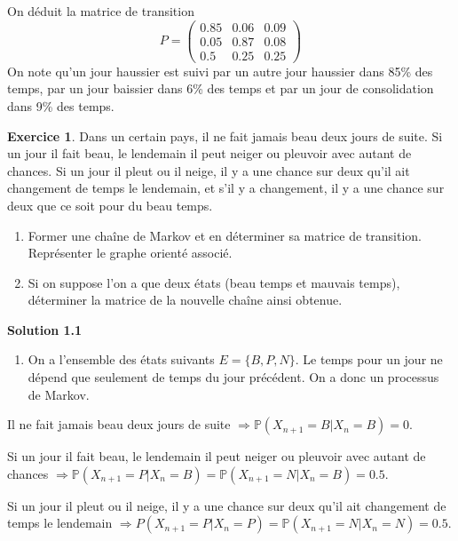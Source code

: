 \documentclass[
]{book}
\providecommand{\tightlist}{%
  \setlength{\itemsep}{0pt}\setlength{\parskip}{0pt}}
\theoremstyle{definition}
\theoremstyle{definition}
\theoremstyle{definition}
\newtheorem{exercise}{Exercice}[chapter]
\theoremstyle{remark}
\begin{document}
On déduit la matrice de transition
\[
P=\left( 
\begin{array}{ccc}
0.85 & 0.06 & 0.09 \\
0.05 & 0.87 & 0.08 \\
0.5 & 0.25 & 0.25
\end{array}
\right)
\]
On note qu'un jour haussier est suivi par un autre jour haussier dans 85\% des temps, par un jour baissier dans 6\% des temps et par un jour de consolidation dans 9\% des temps.
\begin{exercise}
\protect\hypertarget{exr:unnamed-chunk-47}{}{\label{exr:unnamed-chunk-47} }Dans un certain pays, il ne fait jamais beau deux jours de suite. Si un jour il fait beau, le lendemain il peut neiger ou pleuvoir avec autant de chances. Si un jour il pleut ou il neige, il y a une chance sur deux qu'il ait changement de temps le lendemain, et s'il y a changement, il y a une chance sur deux que ce soit pour du beau temps.

\begin{enumerate}
\def\labelenumi{\arabic{enumi}.}
\tightlist
\item
  Former une chaîne de Markov et en déterminer sa matrice de transition. Représenter le graphe orienté associé.
\item
  Si on suppose l'on a que deux états (beau temps et mauvais temps), déterminer la matrice de la nouvelle chaîne ainsi obtenue.
\end{enumerate}
\end{exercise}

\textbf{Solution 1.1}

\begin{enumerate}
\def\labelenumi{\arabic{enumi}.}
\tightlist
\item
  On a l'ensemble des états suivants \(E=\{B,P,N \}\). Le temps pour un jour ne dépend que seulement de temps du jour précédent. On a donc un processus de Markov.
\end{enumerate}

Il ne fait jamais beau deux jours de suite \(\Longrightarrow \mathbb{P}(X_{n+1}=B|X_n=B)=0\).

Si un jour il fait beau, le lendemain il peut neiger ou pleuvoir avec autant de chances \(\Longrightarrow \mathbb{P}(X_{n+1}=P|X_n=B)=\mathbb{P}(X_{n+1}=N|X_n=B)=0.5\).

Si un jour il pleut ou il neige, il y a une chance sur deux qu'il ait changement de temps le lendemain \(\Longrightarrow P(X_{n+1}=P|X_n=P)=\mathbb{P}(X_{n+1}=N|X_n=N)=0.5\).
\end{document}
